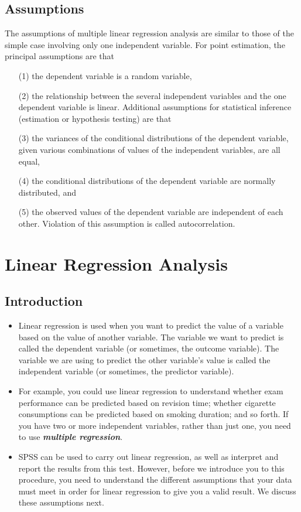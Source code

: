 \documentclass[a4paper,12pt]{article}
\begin{document}
\subsection*{Assumptions}
The assumptions of multiple linear regression analysis are similar to those of the simple case involving only one independent variable. For point estimation, the principal assumptions are that
\begin{itemize}
	\item[(1)] the dependent variable is a random variable,
	\item[(2)] the relationship between the several independent variables and the one dependent variable is linear.
	Additional assumptions for statistical inference (estimation or hypothesis testing) are that
	\item[(3)] the variances of the conditional distributions of the dependent variable, given various combinations of values of the independent variables, are all equal,
	\item[(4)] the conditional distributions of the dependent variable
	are normally distributed, and
	\item[(5)] the observed values of the dependent variable are independent of each other. Violation of this assumption is called autocorrelation.
\end{itemize}	
	
\section{Linear Regression Analysis}

\subsection{Introduction}
\begin{itemize}
\item Linear regression is used when you want to predict the value of a variable based on the value of another variable. The variable we want to predict is called the dependent variable (or sometimes, the outcome variable). The variable we are using to predict the other variable's value is called the independent variable (or sometimes, the predictor variable).


\item For example, you could use linear regression to understand whether exam performance can be predicted based on revision time; whether cigarette consumptions can be predicted based on smoking duration; and so forth. If you have two or more independent variables, rather than just one, you need to use \textbf{\textit{multiple regression}}.

\item SPSS can be used to carry out linear regression, as well as interpret and report the results from this test. However, before we introduce you to this procedure, you need to understand the different assumptions that your data must meet in order for linear regression to give you a valid result. We discuss these assumptions next.

\end{itemize}
\end{document}
